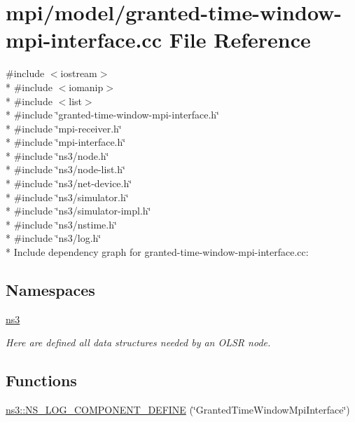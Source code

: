 \hypertarget{granted-time-window-mpi-interface_8cc}{}\section{mpi/model/granted-\/time-\/window-\/mpi-\/interface.cc File Reference}
\label{granted-time-window-mpi-interface_8cc}
{\ttfamily \#include $<$iostream$>$}\\*
{\ttfamily \#include $<$iomanip$>$}\\*
{\ttfamily \#include $<$list$>$}\\*
{\ttfamily \#include \char`\"{}granted-\/time-\/window-\/mpi-\/interface.\+h\char`\"{}}\\*
{\ttfamily \#include \char`\"{}mpi-\/receiver.\+h\char`\"{}}\\*
{\ttfamily \#include \char`\"{}mpi-\/interface.\+h\char`\"{}}\\*
{\ttfamily \#include \char`\"{}ns3/node.\+h\char`\"{}}\\*
{\ttfamily \#include \char`\"{}ns3/node-\/list.\+h\char`\"{}}\\*
{\ttfamily \#include \char`\"{}ns3/net-\/device.\+h\char`\"{}}\\*
{\ttfamily \#include \char`\"{}ns3/simulator.\+h\char`\"{}}\\*
{\ttfamily \#include \char`\"{}ns3/simulator-\/impl.\+h\char`\"{}}\\*
{\ttfamily \#include \char`\"{}ns3/nstime.\+h\char`\"{}}\\*
{\ttfamily \#include \char`\"{}ns3/log.\+h\char`\"{}}\\*
Include dependency graph for granted-\/time-\/window-\/mpi-\/interface.cc\+:
\subsection*{Namespaces}
\begin{DoxyCompactItemize}
\item 
 \hyperlink{namespacens3}{ns3}
\begin{DoxyCompactList}\small\item\em Here are defined all data structures needed by an O\+L\+SR node. \end{DoxyCompactList}\end{DoxyCompactItemize}
\subsection*{Functions}
\begin{DoxyCompactItemize}
\item 
\hyperlink{namespacens3_ae7dae382b0bcab90661b10ded305158d}{ns3\+::\+N\+S\+\_\+\+L\+O\+G\+\_\+\+C\+O\+M\+P\+O\+N\+E\+N\+T\+\_\+\+D\+E\+F\+I\+NE} (\char`\"{}Granted\+Time\+Window\+Mpi\+Interface\char`\"{})
\end{DoxyCompactItemize}

